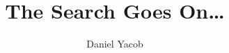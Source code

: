 \documentclass[a4paper]{article}
\begin{document}
\title{The Search Goes On\ldots} 
\author{Daniel Yacob} 


\date{}




%
%
%
%
%
%
%
%
%
%
%
%


%
%
%
%






%
%

%
%
%
%
%
%
%
%
%
%
%
%
%
%
%
%
%
%
\end{document}
